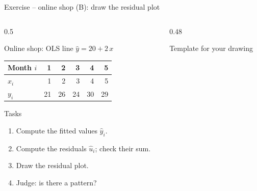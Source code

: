 \documentclass[aspectratio=169,11pt]{beamer}
\begin{document}
\begin{frame}{Exercise -- online shop (B): draw the residual plot}
  \begin{columns}[T]
    \begin{column}{0.5\textwidth}
      \small
      \begin{block}{Online shop: OLS line $\hat{y} = 20 + 2\,x$}
        \begin{center}
          \renewcommand{\arraystretch}{1.05}
          \begin{tabular}{l*{5}{r}}
            \toprule
            Month $i$ & 1  & 2  & 3  & 4  & 5  \\
            \midrule
            $x_i$     & 1  & 2  & 3  & 4  & 5  \\
            $y_i$     & 21 & 26 & 24 & 30 & 29 \\
            \bottomrule
          \end{tabular}
        \end{center}
      \end{block}
      \begin{exampleblock}{Tasks}
        \begin{enumerate}
          \item Compute the fitted values $\hat{y}_i$.
          \item Compute the residuals $\hat{u}_i$; check their sum.
          \item Draw the residual plot.
          \item Judge: is there a pattern?
        \end{enumerate}
      \end{exampleblock}
    \end{column}
    \begin{column}{0.48\textwidth}
      \begin{center}\footnotesize Template for your drawing\end{center}
    \end{column}
  \end{columns}
\end{frame}
\end{document}
